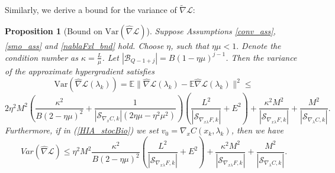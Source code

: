 \documentclass[11pt, twoside]{report}
\newtheorem{proposition}[theorem]{Proposition}
\begin{document}
Similarly, we derive a bound for the variance of $\widetilde{\nabla} \mathcal{L}$:
\begin{proposition}[Bound on $\mathrm{Var}(\widehat{\nabla} \mathcal{L})$] \label{bound_nabla_hat}
Suppose Assumptions \ref{conv_ass}, \ref{smo_ass} and \ref{nablaFxl_bnd} hold. Choose $\eta$, such that $\eta \mu < 1.$ Denote the condition number as $\kappa = \frac{L}{\mu}$. Let $|\mathcal{B}_{Q-1+j}| = B(1-\eta\mu)^{j-1}$. Then the variance of the approximate hypergradient satisfies
\[\mathrm{Var}(\widehat{\nabla} \mathcal{L}(\lambda_k)) = \mathbb{E}\|\widehat{\nabla} \mathcal{L}(\lambda_k) - \mathbb{E}\widehat{\nabla} \mathcal{L}(\lambda_k)\|^2 \leq\]
\[2\eta^2M^2\left(\frac{\kappa^2}{B (2 - \eta \mu)^2} + \frac{1}{|\mathcal{S}_{\nabla_{x} C,k}|(2\eta \mu - \eta^2 \mu^2)} \right)\left(\frac{L^2}{|\mathcal{S}_{\nabla_{x\lambda} F,k}|} + E^2\right)  +  \frac{\kappa^2M^2}{|\mathcal{S}_{\nabla_{x\lambda} F,k}|}+ \frac{M^2}{|\mathcal{S}_{\nabla_{\lambda} C,k}|}.\]
Furthermore, if in (\ref{HIA_stocBio}) we set $v_0 = \nabla_x C(x_k,\lambda_k)$, then we have
    \[Var(\widehat{\nabla} \mathcal{L}) \leq \eta^2M^2\frac{\kappa^2}{B (2 - \eta \mu)^2} \left(\frac{L^2}{|\mathcal{S}_{\nabla_{x\lambda} F,k}|} + E^2\right)  +  \frac{\kappa^2M^2}{|\mathcal{S}_{\nabla_{x\lambda} F,k}|}+ \frac{M^2}{|\mathcal{S}_{\nabla_{\lambda} C,k}|}.\]

    
\end{proposition}
\end{document}
